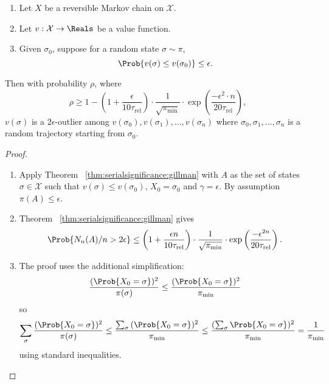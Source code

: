 \documentclass[12pt]{article}
\begin{document}
\begin{example}
\begin{theorem}
    \label{thm:serialsignificance:powerthm}
    \begin{enumerate}
        \item
            Let \( X \) be a reversible Markov chain on \( \mathcal{X} \).
        \item
            Let \( v :  \mathcal{X} \to \Reals \) be a value function.
        \item
            Given \( \sigma_0 \), suppose for a random state \( \sigma
            \sim \pi \),
            \[
                \Prob{v(\sigma) \le v(\sigma_0)} \le \epsilon.
            \]
    \end{enumerate}
    Then with probability \( \rho \), where
    \[
        \rho \ge 1 - \left( 1 + \frac{\epsilon}{10 \tau_{\text{rel}}}
        \right) \cdot \frac{1}{\sqrt{\pi_{\min}}} \cdot \exp \left(
        \frac {-\epsilon^ {2} \cdot n}{20 \tau_{\text{rel}}} \right),
    \] \( v(\sigma) \) is a \( 2\epsilon \)-outlier among \( v(\sigma_0),
    v(\sigma_1), \dots, v(\sigma_n) \) where \( \sigma_0, \sigma_1,
    \dots, \sigma_n \) is a random trajectory starting from \( \sigma_0 \).
\end{theorem}

\begin{proof}
    \begin{enumerate}
        \item
            Apply Theorem~%
            \ref{thm:serialsignificance:gillman} with \( A \) as the set
            of states \( \sigma \in \mathcal{X} \) such that \( v(\sigma)
            \le v(\sigma_0) \), \( X_0 = \sigma_0 \) and \( \gamma =
            \epsilon \).  By assumption \( \pi(A) \le \epsilon \).
        \item
            Theorem~%
            \ref{thm:serialsignificance:gillman} gives
            \[
                \Prob{N_{n}(A)/n > 2\epsilon} \le \left( 1 + \frac{\epsilon
                n}{10 \tau_{\text{rel}}} \right) \cdot \frac{1}{\sqrt{\pi_
                {\min}}} \cdot \exp \left( \frac{-\epsilon^{2 n}}{20
                \tau_{\text{rel}}} \right).
            \]
        \item
            The proof uses the additional simplification:
            \[
                \frac{(\Prob{X_0 = \sigma})^2}{\pi (\sigma)} \le \frac{(\Prob
                {X_0 = \sigma})^2}{\pi_{\min}}
            \] so
            \[
                \sum_{\sigma} \frac{(\Prob{X_0 =\sigma})^2}{\pi (\sigma)}
                \le \frac{\sum_{\sigma}{(\Prob{X_0 =\sigma})^2}}{\pi_{\min}}
                \le \frac{(\sum_{\sigma}\Prob{X_0 =\sigma})^2}{\pi_{\min}}
                = \frac{1}{\pi_{\min}}
            \] using standard inequalities.
    \end{enumerate}
\end{proof}


\end{example}
\end{document}
